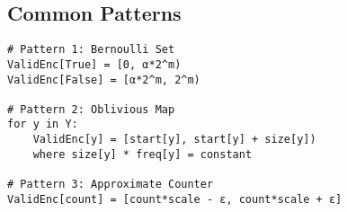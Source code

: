 \documentclass[11pt,final,hidelinks]{article}
\begin{document}
\subsection{Common Patterns}

\begin{verbatim}
# Pattern 1: Bernoulli Set
ValidEnc[True] = [0, α*2^m)
ValidEnc[False] = [α*2^m, 2^m)

# Pattern 2: Oblivious Map
for y in Y:
    ValidEnc[y] = [start[y], start[y] + size[y])
    where size[y] * freq[y] = constant

# Pattern 3: Approximate Counter
ValidEnc[count] = [count*scale - ε, count*scale + ε]
\end{verbatim}
\end{document}
